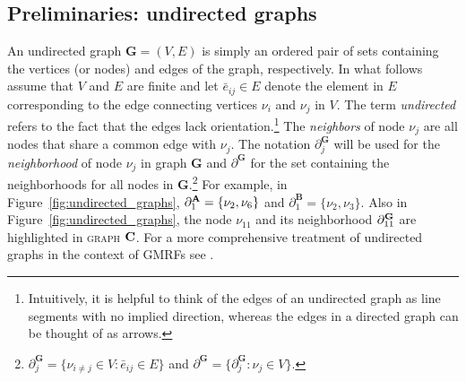 \subsection{Preliminaries: undirected graphs}
\label{undirected_graphs}

An undirected graph $\mathbf{G} = (V,E)$ is simply an ordered pair of sets containing the 
vertices (or nodes) and edges of the graph, respectively. In what follows assume that $V$ 
and $E$ are finite and let $\bar{e}_{ij} \in E$ denote the element in $E$ corresponding to the 
edge connecting vertices $\nu_i$ and $\nu_j$ in $V$. The term {\it undirected} refers to the fact 
that the edges lack orientation.\footnote{Intuitively, it is helpful to think of the edges of an 
undirected graph as line segments with no implied direction, whereas the edges in a directed 
graph can be thought of as arrows.} The {\it neighbors} of node $\nu_j$ are all nodes that 
share a common edge with $\nu_j$. The notation $\partial^{\mathbf{G}}_j$ will be used for the 
{\it neighborhood} of node $\nu_j$ in graph  $\mathbf{G}$ and $\partial^\mathbf{G}$ for the set 
containing the neighborhoods for all nodes in $\mathbf{G}$.\footnote{$ \partial^\mathbf{G}_j = 
\{\nu_{i \neq j} \in V : \bar{e}_{ij} \in E\}$ and 
$\partial^\mathbf{G} = \{\partial^\mathbf{G}_j : \nu_j \in V\}$.} 
For example, in Figure~\ref{fig:undirected_graphs}, 
$\partial^{\mathbf{A}}_1 = \{\nu_2, \nu_6\}$ and $\partial^{\mathbf{B}}_1 = \{\nu_2, \nu_3\}$. 
Also in Figure~\ref{fig:undirected_graphs}, the node $\nu_{11}$ and its neighborhood 
$\partial^{\mathbf{G}}_{11}$ are highlighted in \textsc{graph $\mathbf{C}$}. 
For a more comprehensive treatment of undirected graphs in the context of GMRFs see 
. 

